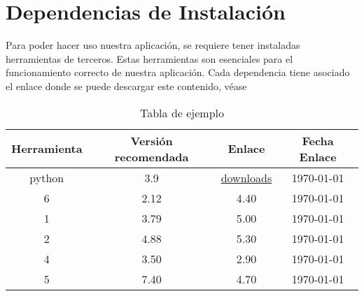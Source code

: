 \chapter{Dependencias de Instalación}
\label{Appendix:Key1}

Para poder hacer uso nuestra aplicación, se requiere tener instaladas herramientas de terceros. Estas herramientas son esenciales para el funcionamiento correcto de nuestra aplicación.
Cada dependencia tiene asociado el enlace donde se puede descargar este contenido, véase


\begin{table}
    \centering
	\begin{tabular}{c|c|c|c}
		\textbf{Herramienta} & \textbf{Versión recomendada} & \textbf{Enlace} & \textbf{Fecha Enlace} \\
		\hline\hline
		python & 3.9 & \href{https://www.python.org/downloads/}{downloads} & \today\\
		6 & 2.12 & 4.40 & \today\\
		1 & 3.79 & 5.00 & \today\\
		2 & 4.88 & 5.30 & \today\\
		4 & 3.50 & 2.90 & \today\\
		5 & 7.40 & 4.70 & \today\\
		\hline
	\end{tabular}
	\caption{Tabla de ejemplo}
	\label{tab:sampleTable}
\end{table}